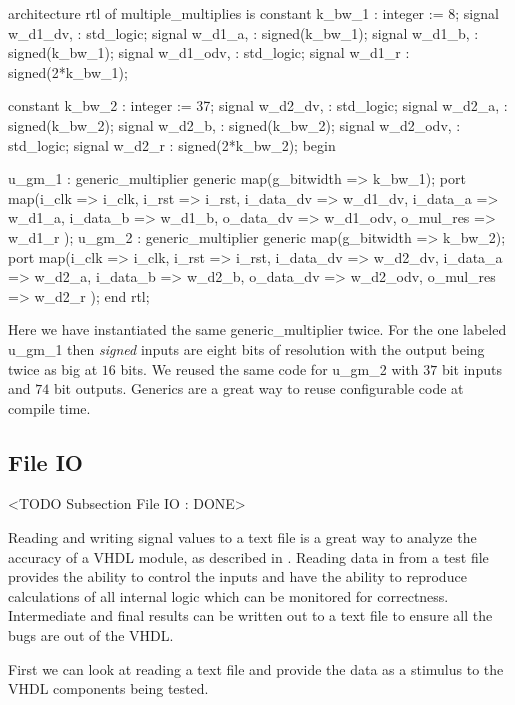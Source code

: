 \begin{VHDLlisting}[tabsize=4]
architecture rtl of multiple_multiplies is
    constant k_bw_1    : integer := 8;
    signal w_d1_dv,    : std_logic;
    signal w_d1_a,     : signed(k_bw_1);
    signal w_d1_b,     : signed(k_bw_1);
    signal w_d1_odv,   : std_logic;
    signal w_d1_r      : signed(2*k_bw_1);
    
    constant k_bw_2    : integer := 37;
    signal w_d2_dv,    : std_logic;
    signal w_d2_a,     : signed(k_bw_2);
    signal w_d2_b,     : signed(k_bw_2);
    signal w_d2_odv,   : std_logic;
    signal w_d2_r      : signed(2*k_bw_2);
begin

u_gm_1 : generic_multiplier
generic map(g_bitwidth => k_bw_1);
port map(i_clk      => i_clk,
         i_rst      => i_rst,
         i_data_dv  => w_d1_dv,
         i_data_a   => w_d1_a,
         i_data_b   => w_d1_b,
         o_data_dv  => w_d1_odv,
         o_mul_res  => w_d1_r
);
u_gm_2 : generic_multiplier
generic map(g_bitwidth => k_bw_2);
port map(i_clk      => i_clk,
         i_rst      => i_rst,
         i_data_dv  => w_d2_dv,
         i_data_a   => w_d2_a,
         i_data_b   => w_d2_b,
         o_data_dv  => w_d2_odv,
         o_mul_res  => w_d2_r
);
end rtl;
\end{VHDLlisting}

Here we have instantiated the same generic\_multiplier twice. For the one labeled u\_gm\_1 then \emph{signed} inputs are eight bits of resolution with the output being twice as big at $16$ bits. We reused the same code for u\_gm\_2 with $37$ bit inputs and $74$ bit outputs. Generics are a great way to reuse configurable code at compile time.
	
\subsection{File IO}
	<TODO Subsection File IO : DONE>
\label{sec:fileio}
	
Reading and writing signal values to a text file is a great way to analyze the accuracy of a \ac{VHDL} module, as described in . Reading data in from a test file provides the ability to control the inputs and have the ability to reproduce calculations of all internal logic which can be monitored for correctness. Intermediate and final results can be written out to a text file to ensure all the bugs are out of the \ac{VHDL}. 

First we can look at reading a text file and provide the data as a stimulus to the \ac{VHDL} components being tested. 

